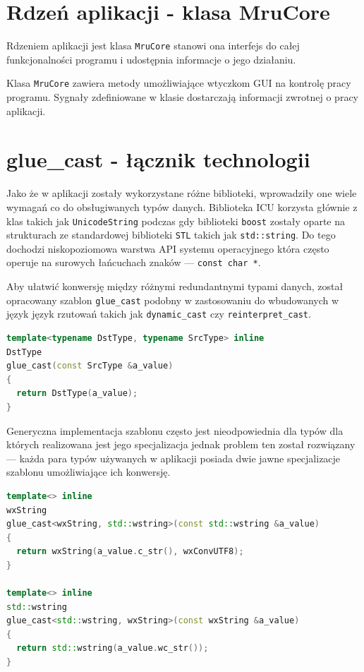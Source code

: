 \section{Rdzeń aplikacji - klasa MruCore}
Rdzeniem aplikacji jest klasa \texttt{MruCore} stanowi ona interfejs do całej funkcjonalności programu i udostępnia informacje o jego działaniu.
\par
Klasa \texttt{MruCore} zawiera metody umożliwiające wtyczkom GUI na kontrolę pracy programu. Sygnały zdefiniowane w klasie dostarczają informacji zwrotnej o pracy aplikacji.

\section{glue\_cast - łącznik technologii}
Jako że w aplikacji zostały wykorzystane różne biblioteki, wprowadziły one wiele wymagań co do obsługiwanych typów danych.
Biblioteka ICU korzysta głównie z klas takich jak \texttt{UnicodeString} podczas gdy biblioteki \texttt{boost} zostały oparte na strukturach ze standardowej biblioteki \texttt{STL} takich jak \texttt{std::string}. Do tego dochodzi niskopoziomowa warstwa API systemu operacyjnego która często operuje na surowych łańcuchach znaków --- \texttt{const char *}.
\par
Aby ułatwić konwersję między różnymi redundantnymi typami danych, został opracowany szablon \texttt{glue\_cast} podobny w zastosowaniu do wbudowanych w język język rzutowań takich jak \texttt{dynamic\_cast} czy \texttt{reinterpret\_cast}.

\begin{lstlisting}[caption={ glue.hpp}, language=C++]
template<typename DstType, typename SrcType> inline
DstType
glue_cast(const SrcType &a_value)
{
  return DstType(a_value);
}
\end{lstlisting}

\par
Generyczna implementacja szablonu często jest nieodpowiednia dla typów dla których realizowana jest jego specjalizacja jednak problem ten został rozwiązany --- każda para typów używanych w aplikacji posiada dwie jawne specjalizacje szablonu umożliwiające ich konwersję.
\begin{lstlisting}[caption={ Fragment glue\_impl.hpp --- specjalizacja dla std::wstring i wxString}, language=C++]
template<> inline
wxString
glue_cast<wxString, std::wstring>(const std::wstring &a_value)
{
  return wxString(a_value.c_str(), wxConvUTF8);
}

template<> inline
std::wstring
glue_cast<std::wstring, wxString>(const wxString &a_value)
{
  return std::wstring(a_value.wc_str());
}

\end{lstlisting}

